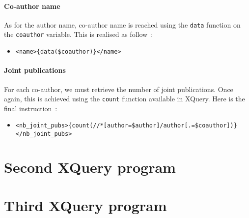 \documentclass{article}
\begin{document}
\paragraph{Co-author name}
As for the author name, co-author name is reached using the \verb|data| function on the \verb|coauthor| variable. This is realised as follow~:
\begin{itemize}
\item \verb|<name>{data($coauthor)}</name>|
\end{itemize}
\paragraph{Joint publications}
For each co-author, we must retrieve the number of joint publications. Once again, this is achieved using the \verb|count| function available in XQuery. Here is the final instruction~:
\begin{itemize}
\item \verb|<nb_joint_pubs>{count(//*[author=$author]/author[.=$coauthor])}</nb_joint_pubs>|
\end{itemize}

\section{Second XQuery program}

\section{Third XQuery program}
\end{document}
